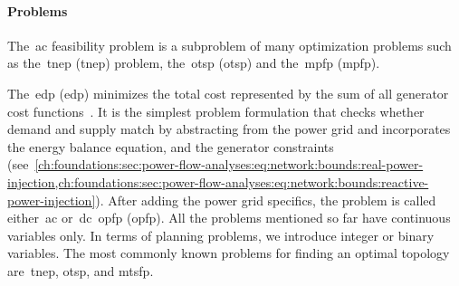 \paragraph{Problems}%
\label{ch:foundations:sec:power-flow-analyses:problems}%
% 
The~\gls{ac} feasibility problem is a subproblem of many
optimization problems such as the~\acrlong{tnep} (\gls{tnep}) problem, 
the~\acrlong{otsp} (\gls{otsp}) and
the~\acrlong{mpfp} (\gls{mpfp}).

The~\acrlong{edp} (\gls{edp}) minimizes the total cost represented by the sum of
all generator cost functions~\cost. It is the simplest problem formulation that
checks whether demand and supply match by abstracting from the power grid and
incorporates the energy balance equation, and the generator constraints
(see~\cref{ch:foundations:sec:power-flow-analyses:eq:network:bounds:real-power-injection,ch:foundations:sec:power-flow-analyses:eq:network:bounds:reactive-power-injection}).
After adding the power grid specifics, the problem is called either~\gls{ac}
or~\gls{dc}~\acrlong{opfp} (\gls{opfp}). All the problems mentioned so far have
continuous variables only.
% 
In terms of planning problems, we introduce integer or binary variables. The
most commonly known problems for finding an optimal topology are~\gls{tnep},
\gls{otsp}, and \gls{mtsfp}.
%  





%     

